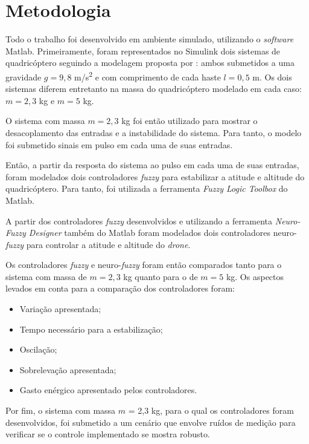 \chapter{Metodologia}
\label{chap:metodologia}

Todo o trabalho foi desenvolvido em ambiente simulado, utilizando o \textit{software} Matlab\textsuperscript{\textregistered}. Primeiramente, foram representados no Simulink\textsuperscript{\textregistered} dois sistemas de quadricóptero seguindo a modelagem proposta por : ambos submetidos a uma gravidade $g = 9,8$ m/s\textsuperscript{2} e com comprimento de cada haste $l = 0,5$ m. Os dois sistemas diferem entretanto na massa do quadricóptero modelado em cada caso: $m = 2,3$ kg e $m = 5$ kg.

O sistema com massa $m = 2,3$ kg foi então utilizado para mostrar o desacoplamento das entradas e a instabilidade do sistema. Para tanto, o modelo foi submetido sinais em pulso em cada uma de suas entradas.

Então, a partir da resposta do sistema ao pulso em cada uma de suas entradas, foram modelados dois controladores \textit{fuzzy} para estabilizar a atitude e altitude do quadricóptero. Para tanto, foi utilizada a ferramenta \textit{Fuzzy Logic Toolbox} do Matlab\textsuperscript{\textregistered}.

A partir dos controladores \textit{fuzzy} desenvolvidos e utilizando a ferramenta \textit{Neuro-Fuzzy Designer} também do Matlab\textsuperscript{\textregistered} foram modelados dois controladores neuro-\textit{fuzzy} para controlar a atitude e altitude do \textit{drone}.

Os controladores \textit{fuzzy} e neuro-\textit{fuzzy} foram então comparados tanto para o sistema com massa de $m = 2,3$ kg quanto para o de $m = 5$ kg. Os aspectos levados em conta para a comparação dos controladores foram:
\begin{itemize}
	\item Variação apresentada;
	\item Tempo necessário para a estabilização;
	\item Oscilação;
	\item Sobrelevação apresentada;
	\item Gasto enérgico apresentado pelos controladores.
\end{itemize}

Por fim, o sistema com massa $m$ = 2,3 kg, para o qual os controladores foram desenvolvidos, foi submetido a um cenário que envolve ruídos de medição para verificar se o controle implementado se mostra robusto.

